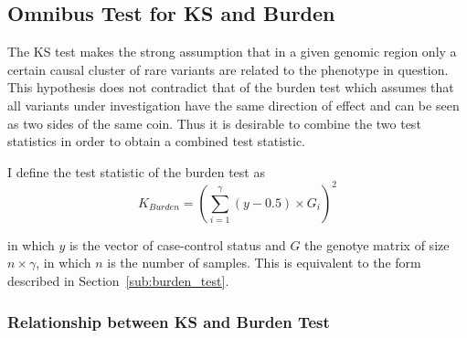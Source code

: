 \subsection{Omnibus Test for KS and Burden}
\label{sub:omnibus_test_for_ks_and_burden}

The KS test makes the strong assumption that in a given genomic region only a certain causal cluster of rare variants are related to the phenotype in question.
This hypothesis does not contradict that of the burden test which assumes that all variants under investigation have the same direction of effect and can be seen as two sides of the same coin.
Thus it is desirable to combine the two test statistics in order to obtain a combined test statistic.

I define the test statistic of the burden test as 
\begin{equation}\label{eq:burden_simple}
  K_{Burden} = {(\sum^\gamma_{i=1} (y-0.5) \times G_i)}^2
\end{equation}

in which $y$ is the vector of case-control status and $G$ the genotye matrix of size $n \times \gamma$, in which $n$ is the number of samples.
This is equivalent to the form described in Section~\ref{sub:burden_test}.

\subsubsection{Relationship between KS and Burden Test}
\label{ssub:Relationship_between_KS_and_Burden_Test}

